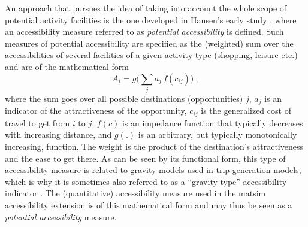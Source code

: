 An approach that pursues the idea of taking into account the whole scope of potential activity facilities is the one 
developed in Hansen's early study \citep{Hansen1959HowAccessibilityShapesLandUse}, where an accessibility 
measure referred to as \textit{potential accessibility} is defined. Such measures of potential accessibility are 
specified as the (weighted) sum over the 
accessibilities of several facilities of a given activity type (\eg shopping, leisure etc.) and are of the mathematical form
\begin{equation}
	A_i = g\Big( \sum_j a_j \, f(c_{ij}) \Big) \ ,
	\label{eq:accessibility:basic}
\end{equation}
where the sum goes over all possible destinations (opportunities) $j$, $a_j$ is an indicator of the attractiveness of 
the opportunity, $c_{ij}$ is the generalized cost of travel to get from $i$ to $j$, $f(c)$ is an impedance function 
that typically decreases with increasing distance, and $g(.)$ is an arbitrary, but typically monotonically increasing, 
function. 
The weight is the product of the destination's attractiveness and the ease to get there. As can be seen by its 
functional form, this type of accessibility measure is related to gravity models used in trip generation models, which 
is why it is sometimes also referred to as a “gravity type” accessibility indicator 
\citep{MorrisEtAl1978AccessibilityIndicators}. The (quantitative) accessibility measure used in the \gls{matsim} 
accessibility extension is of this mathematical form and may thus be seen as a \textit{potential accessibility} measure.




